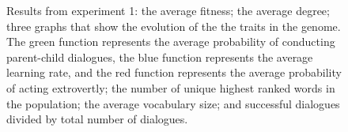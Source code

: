\begin{figure}[b]\setcounter{subfigure}{0}
    \centering
    \hfill
    \caption[Graphs of the results from experiment 2 as a function of number of generations.]{Results from experiment 1:  the average fitness;  the average degree;  three graphs that show the evolution of the the traits in the genome. The green function represents the average probability of conducting parent-child dialogues, the blue function represents the average learning rate, and the red function represents the average probability of acting extrovertly;  the number of unique highest ranked words in the population;  the average vocabulary size; and  successful dialogues divided by total number of dialogues.}
    \label{fig:exp1.0}
\end{figure}
%
